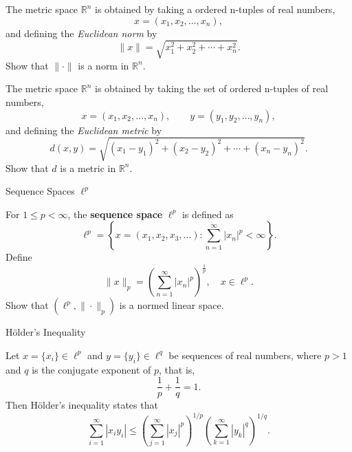 \documentclass[12pt, a4paper]{article}
\begin{document}
\begin{theorem}
    The metric space $\mathbb{R}^n$ is obtained by taking a ordered n-tuples of
    real numbers,
    \[
    x=(x_1,x_2,\ldots,x_n),
    \]
    and defining the \emph{Euclidean norm} by
    \[
    \|x\|=\sqrt{x_1^2+x_2^2+\cdots+x_n^2}.
    \]
    Show that $\|\cdot\|$ is a norm in $\mathbb{R}^n$.
\end{theorem}

\vspace{150pt}

\begin{theorem}
    The metric space $\mathbb{R}^n$ is obtained by taking the set of ordered n-tuples of
    real numbers,
    \[
    x=(x_1,x_2,\ldots,x_n), \qquad y=(y_1,y_2,\ldots,y_n),
    \]
    and defining the \emph{Euclidean metric} by
    \[
    d(x,y)=\sqrt{(x_1-y_1)^2+(x_2-y_2)^2+\cdots+(x_n-y_n)^2}.
    \]    
    Show that $d$ is a metric in $\mathbb{R}^n$.
\end{theorem}

\clearpage

\begin{heading}
    Sequence Spaces $\ell^p$
\end{heading}

\vspace{10pt}

\begin{definition}
    For $1\le p<\infty$, the \textbf{sequence space} $\ell^p$ is defined as
    \[
        \ell^p=\left\{x=(x_1, x_2, x_3, \dots):\sum_{n=1}^\infty|x_n|^p<\infty\right\}.
    \]
    Define \[\|x\|_p=\left(\sum_{n=1}^\infty|x_n|^p\right)^{\frac{1}{p}}, \quad x\in\ell^p.\]
    Show that $(\ell^p,\|\cdot\|_p)$ is a normed linear space.
\end{definition}

\clearpage

\begin{heading}
    Hölder's Inequality
\end{heading}

\vspace{10pt}

\begin{theorem}
Let $x=\{x_i\}\in \ell^p$ and $y=\{y_i\}\in \ell^q$ be sequences of real numbers,
where $p>1$ and $q$ is the conjugate exponent of $p$, that is,
\[
\frac{1}{p}+\frac{1}{q}=1.
\]
Then H\"older's inequality states that
\[
\sum_{i=1}^{\infty} |x_i y_i|
\le
\left(\sum_{j=1}^{\infty} |x_j|^p\right)^{\!1/p}
\left(\sum_{k=1}^{\infty} |y_k|^q\right)^{\!1/q}.
\]
\end{theorem}
\end{document}

